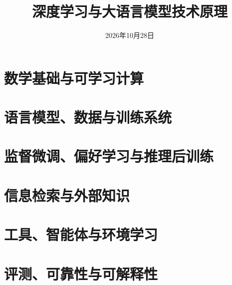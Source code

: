 \documentclass[UTF8,12pt,a4paper,fontset=fandol]{ctexbook}
\title{深度学习与大语言模型技术原理}
\author{}
\date{2026年10月28日}
\begin{document}
\frontmatter %

\maketitle
\tableofcontents
\mainmatter


\part{数学基础与可学习计算}



\part{语言模型、数据与训练系统}







\part{监督微调、偏好学习与推理后训练}





\part{信息检索与外部知识}



\part{工具、智能体与环境学习}




\part{评测、可靠性与可解释性}
\end{document}
